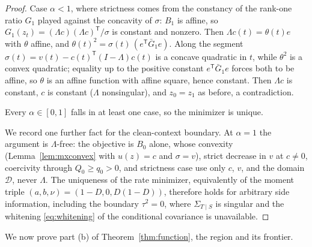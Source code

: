 \documentclass[11pt,onecolumn]{IEEEtran}
\begin{document}
\begin{proof}
Case $\alpha<1$, where strictness comes from the constancy of the
rank-one ratio $G_1$ played against the concavity of $\sigma$: $B_1$
is affine, so
$G_1(z_t)=(\Lambda c)(\Lambda c)^{\mathsf T}/\sigma$ is constant and
nonzero. Then $\Lambda c(t)=\theta(t)e$ with $\theta$ affine, and
$\theta(t)^2=\sigma(t)\,(e^{\mathsf T}\bar G_1e)$. Along the segment
$\sigma(t)=v(t)-c(t)^{\mathsf T}(I-\Lambda)c(t)$ is a concave
quadratic in $t$, while $\theta^2$ is a convex quadratic; equality up
to the positive constant $e^{\mathsf T}\bar G_1e$ forces both to be
affine, so $\theta$ is an affine function with affine square, hence
constant. Then $\Lambda c$ is constant, $c$ is constant ($\Lambda$
nonsingular), and $z_0=z_1$ as before, a contradiction.

Every $\alpha\in[0,1]$ falls in at least one case, so the minimizer is
unique.

We record one further fact for the clean-context boundary. At
$\alpha=1$ the argument is $\Lambda$-free: the objective is $B_0$
alone, whose convexity (Lemma~\ref{lem:mxconvex} with $u(z)=c$ and
$\sigma=v$), strict decrease in $v$ at $c\ne0$, coercivity through
$Q_0\ge q_0>0$, and strictness case use only $c$, $v$, and the domain
$\mathcal D$, never $\Lambda$. The uniqueness of the rate minimizer,
equivalently of the moment triple $(a,b,\nu)=(1-D,0,D(1-D))$, therefore
holds for arbitrary side information, including the boundary $\tau^2=0$,
where $\Sigma_{T\mid S}$ is singular and the whitening
\eqref{eq:whitening} of the conditional covariance is unavailable.
\end{proof}

We now prove part (b) of Theorem~\ref{thm:function}, the region and its
frontier.
\end{document}
